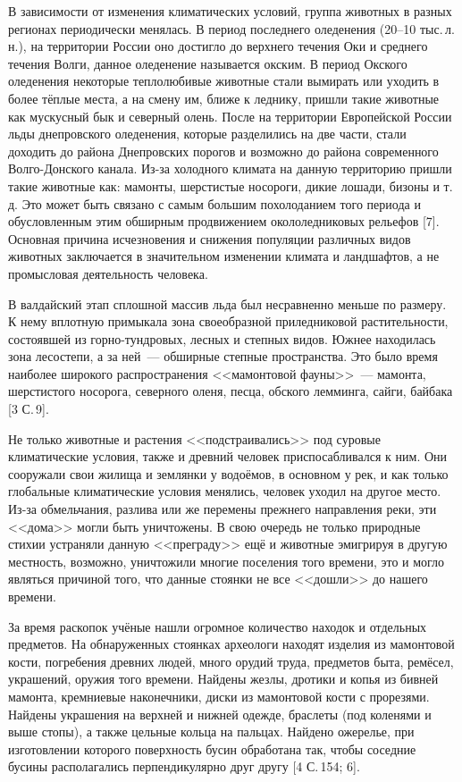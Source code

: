 В зависимости от изменения климатических условий, группа животных в разных регионах периодически менялась. В период последнего оледенения (20--10 тыс.\,л.\,н.), на территории России оно достигло до верхнего течения Оки и среднего течения Волги, данное оледенение называется окским. В период Окского оледенения некоторые теплолюбивые животные стали вымирать или уходить в более тёплые места, а на смену им, ближе к леднику, пришли такие животные как мускусный бык и северный олень. После на территории Европейской России льды днепровского оледенения, которые разделились на две части, стали доходить до района Днепровских порогов и возможно до района современного Волго-Донского канала. Из-за холодного климата на данную территорию пришли такие животные как: мамонты, шерстистые носороги, дикие лошади, бизоны и т.\,д. Это может быть связано с самым большим похолоданием того периода и обусловленным этим обширным продвижением окололедниковых рельефов [7]. Основная причина исчезновения и снижения популяции различных видов животных заключается в значительном изменении климата и ландшафтов, а не промысловая деятельность человека.

В валдайский этап сплошной массив льда был несравненно меньше по размеру. К нему вплотную примыкала зона своеобразной приледниковой растительности, состоявшей из горно-тундровых, лесных и степных видов. Южнее находилась зона лесостепи, а за ней~--- обширные степные пространства. Это было время наиболее широкого распространения <<мамонтовой фауны>>~--- мамонта, шерстистого носорога, северного оленя, песца, обского лемминга, сайги, байбака [3 С.\,9].

Не только животные и растения <<подстраивались>> под суровые климатические условия, также и древний человек приспосабливался к ним. Они сооружали свои жилища и землянки у водоёмов, в основном у рек, и как только глобальные климатические условия менялись, человек уходил на другое место. Из-за обмельчания, разлива или же перемены прежнего направления реки, эти <<дома>> могли быть уничтожены. В свою очередь не только природные стихии устраняли данную <<преграду>> ещё и животные эмигрируя в другую местность, возможно, уничтожили многие поселения того времени, это и могло являться причиной того, что данные стоянки не все <<дошли>> до нашего времени.

За время раскопок учёные нашли огромное количество находок и отдельных предметов. На обнаруженных стоянках археологи находят изделия из мамонтовой кости, погребения древних людей, много орудий труда, предметов быта, ремёсел, украшений, оружия того времени. Найдены жезлы, дротики и копья из бивней мамонта, кремниевые наконечники, диски из мамонтовой кости с прорезями. Найдены украшения на верхней и нижней одежде, браслеты (под коленями и выше стопы), а также цельные кольца на пальцах. Найдено ожерелье, при изготовлении которого поверхность бусин обработана так, чтобы соседние бусины располагались перпендикулярно друг другу [4 С.\,154; 6].

